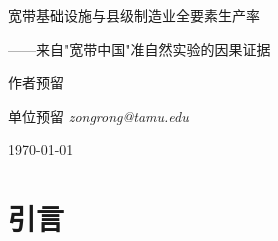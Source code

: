 \documentclass[12pt, a4paper]{article}
\begin{document}

\begin{titlepage}
\centering
\vspace*{2cm}
{\LARGE\heiti 宽带基础设施与县级制造业全要素生产率\par}
\vspace{0.5em}
{\large\heiti ——来自"宽带中国"准自然实验的因果证据\par}
\vspace{2cm}
{\large 作者预留\par}
\vspace{0.5em}
{\normalsize 单位预留 \quad \textit{zongrong@tamu.edu}\par}
\vspace{2cm}
{\normalsize \today\par}
\vspace{3cm}
\begin{abstract}
\noindent
本文利用"宽带中国"示范城市分批次遴选所形成的准自然实验，采用
Callaway \& Sant'Anna（2021）CS-DiD估计量，识别宽带基础设施建设对辖区
县级制造业全要素生产率（TFP）的因果效应。基于2010—2018年300个县级单元
的平衡面板数据（$N=2700$），本文发现：第一，宽带中国政策使县级制造业
TFP平均提升0.1117个对数点（SE$=0.0062$，$p<0.01$），相当于样本均值的4.3\%；
效应于政策实施当年即显现，并在此后四年持续稳定，无衰减迹象。第二，机制
检验表明，政策通过专利创新渠道传导约5.7\%的TFP效应，但要素配置效率提升
是更主导的传导机制。第三，效应在空间上高度不均：东部县效应（$\hat\beta=0.1403$）
约为西部县（$\hat\beta=0.0836$）的1.67倍；大规模县域效应（$\hat\beta=0.1279$）
较小县高46\%，显示出网络外部性与互补资产的空间集聚特征。上述结论在
5项稳健性检验下保持不变。本文为宽带基础设施投资提供了县级层面的因果
证据，并揭示政策红利在欠发达地区需辅以互补性政策支持。

\vspace{0.8em}
\noindent\textbf{关键词：}宽带中国；全要素生产率；Staggered DiD；CS-DiD；
数字基础设施；县级异质性

\vspace{0.5em}
\noindent\textbf{JEL分类号：}O33；R11；H54；L96
\end{abstract}
\end{titlepage}

\newpage
\tableofcontents
\newpage

\section{引言}
\end{document}
